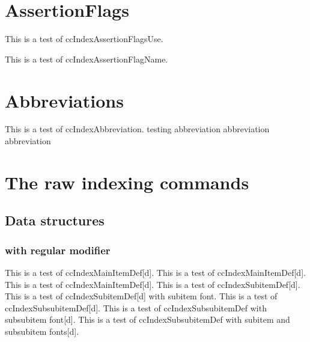 \documentclass{article}
\begin{document}
{{{{%
\section{AssertionFlags}

This is a test of ccIndexAssertionFlagsUse\ccIndexAssertionFlagsUse.

This is a test of ccIndexAssertionFlagName.

 
\section{Abbreviations}

This is a test of ccIndexAbbreviation.
testing
abbreviation
abbreviation
abbreviation

\section{The raw indexing commands}

\subsection{Data structures}

\subsubsection{with regular modifier}

This is a test of ccIndexMainItemDef[d].
This is a test of ccIndexMainItemDef[d].
This is a test of ccIndexMainItemDef[d].
This is a test of ccIndexSubitemDef[d].
This is a test of ccIndexSubitemDef[d] with subitem font.
This is a test of ccIndexSubsubitemDef[d].
This is a test of ccIndexSubsubitemDef with subsubitem font[d].
This is a test of ccIndexSubsubitemDef with subitem and subsubitem fonts[d].

}}}}
\end{document}
